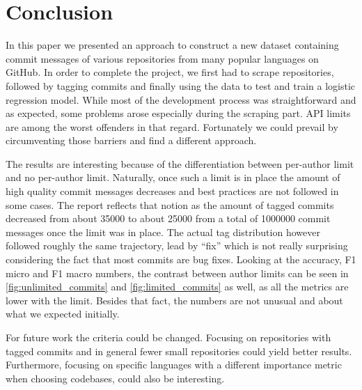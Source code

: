 \section{Conclusion}
\label{sec:conclusion}

In this paper we presented an approach to construct a new dataset containing
commit messages of various repositories from many popular languages on GitHub.
In order to complete the project, we first had to scrape repositories, followed
by tagging commits and finally using the data to test and train a logistic
regression model. While most of the development process was straightforward and
as expected, some problems arose especially during the scraping part. API limits
are among the worst offenders in that regard. Fortunately we could prevail by
circumventing those barriers and find a different approach.

The results are interesting because of the differentiation between per-author
limit and no per-author limit. Naturally, once such a limit is in place the
amount of high quality commit messages decreases and best practices are not
followed in some cases. The report reflects that notion as the amount of
tagged commits decreased from about 35000 to about 25000 from a total of
1000000 commit messages once the limit was in place. The actual tag distribution
however followed roughly the same trajectory, lead by “fix” which is
not really surprising considering the fact that most commits are bug fixes.
Looking at the accuracy, F1 micro and F1 macro numbers, the contrast between
author limits can be seen in \autoref{fig:unlimited_commits} and \autoref{fig:limited_commits}
as well, as all the metrics are lower with the limit. Besides that fact, the
numbers are not unusual and about what we expected initially.

For future work the criteria could be changed. Focusing on repositories with
tagged commits and in general fewer small repositories could yield better
results. Furthermore, focusing on specific languages with a different
importance metric when choosing codebases, could also be interesting.
